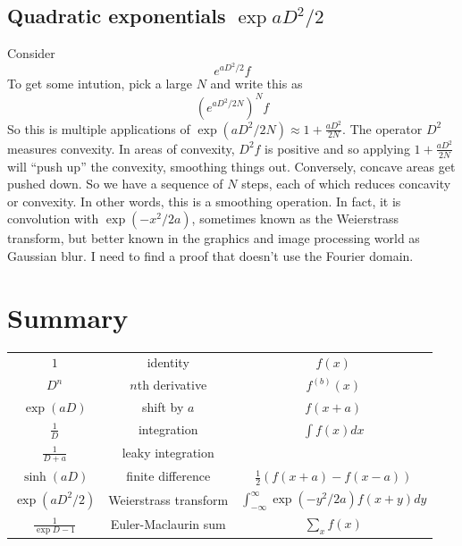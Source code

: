 \documentclass[a4paper]{article}
\theoremstyle{definition}
\begin{document}
\subsection{Quadratic exponentials $\exp{aD^2/2}$}
Consider
\[
e^{aD^2/2}f
\]
To get some intution, pick a large $N$ and write this as
\[
(e^{aD^2/2N})^Nf
\]
So this is multiple applications of $\exp(aD^2/2N) \approx 1+\frac{aD^2}{2N}$.
The operator $D^2$ measures convexity.
In areas of convexity, $D^2f$ is positive and so applying $1+\frac{aD^2}{2N}$ will ``push up'' the convexity, smoothing things out.
Conversely, concave areas get pushed down.
So we have a sequence of $N$ steps, each of which reduces concavity or convexity.
In other words, this is a smoothing operation.
In fact, it is convolution with $\exp(-x^2/2a)$, sometimes known as the Weierstrass transform, but better known in the graphics and image processing world as Gaussian blur.
I need to find a proof that doesn't use the Fourier domain.

\section{Summary}
\begin{center}
\tabulinesep=1.2mm
\begin{tabu}{|c|c|c|}
\hline
$1$ & identity & $f(x)$ \\
$D^n$ & $n$th derivative & $f^{(b)}(x)$ \\
$\exp(aD)$ & shift by $a$ & $f(x+a)$ \\
$\frac{1}{D}$ & integration & $\int f(x)dx$ \\
$\frac{1}{D+a}$ & leaky integration & \\
$\sinh(aD)$ & finite difference & $\frac{1}{2}(f(x+a)-f(x-a))$ \\
$\exp(aD^2/2)$ & Weierstrass transform & $\int_{-\infty}^\infty \exp(-y^2/2a) f(x+y)dy$ \\
$\frac{1}{\exp D-1}$ & Euler-Maclaurin sum & $\sum_x f(x)$ \\
\hline
\end{tabu}
\end{center}



\end{document}
